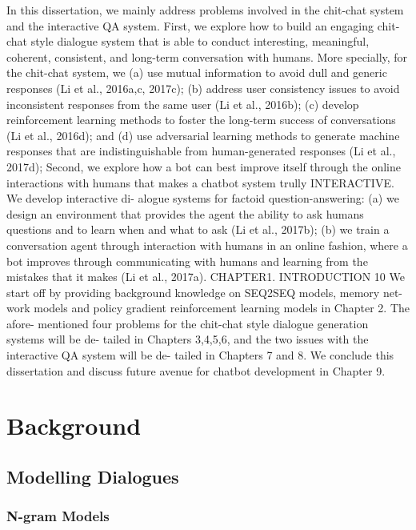 \documentclass[bsc,frontabs,twoside,singlespacing,parskip,deptreport]{infthesis}     %
\begin{document}
In this dissertation, we mainly address problems involved in the chit-chat system and the interactive QA system. First, we explore how to build an engaging chit-chat style dialogue system that is able to conduct interesting, meaningful, coherent, consistent, and long-term conversation with humans. More specially, for the chit-chat system, we (a) use mutual information to avoid dull and generic responses (Li et al., 2016a,c, 2017c); (b) address user consistency issues to avoid inconsistent responses from the same user (Li et al., 2016b); (c) develop reinforcement learning methods to foster the long-term success of conversations (Li et al., 2016d); and (d) use adversarial learning methods to generate machine responses that are indistinguishable from human-generated responses (Li et al., 2017d);
Second, we explore how a bot can best improve itself through the online interactions with humans that makes a chatbot system trully INTERACTIVE. We develop interactive di- alogue systems for factoid question-answering: (a) we design an environment that provides the agent the ability to ask humans questions and to learn when and what to ask (Li et al., 2017b); (b) we train a conversation agent through interaction with humans in an online fashion, where a bot improves through communicating with humans and learning from the mistakes that it makes (Li et al., 2017a).
CHAPTER1. INTRODUCTION 10
We start off by providing background knowledge on SEQ2SEQ models, memory net- work models and policy gradient reinforcement learning models in Chapter 2. The afore- mentioned four problems for the chit-chat style dialogue generation systems will be de- tailed in Chapters 3,4,5,6, and the two issues with the interactive QA system will be de- tailed in Chapters 7 and 8. We conclude this dissertation and discuss future avenue for chatbot development in Chapter 9.







\chapter{Background}

\section{Modelling Dialogues}
\subsection{N-gram Models}
\end{document}
